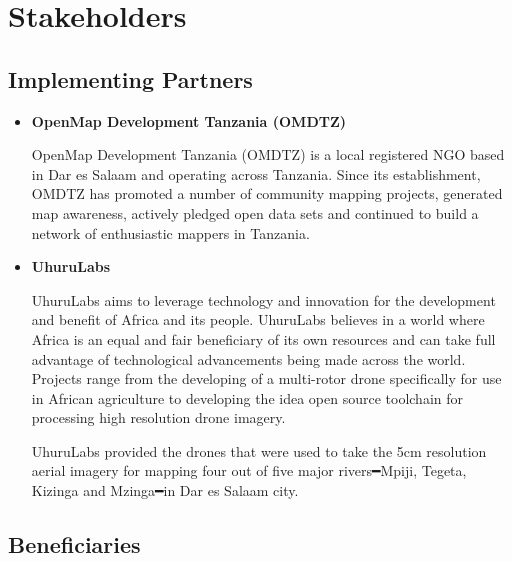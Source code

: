 \documentclass[a4paper,12pt,twoside]{article}
\begin{document}
\section{Stakeholders}

\subsection{Implementing Partners}

    \begin{itemize}
        \item \textbf{OpenMap Development Tanzania (OMDTZ)} %
    
        OpenMap Development Tanzania (OMDTZ) is a local registered NGO based in Dar es Salaam and operating across Tanzania. Since its establishment, OMDTZ has promoted a number of community mapping projects, generated map awareness, actively pledged open data sets and continued to build a network of enthusiastic mappers in Tanzania.
    
        \item \textbf{UhuruLabs}
    
        UhuruLabs aims to leverage technology and innovation for the development and benefit of Africa and its people. UhuruLabs believes in a world where Africa is an equal and fair beneficiary of its own resources and can take full advantage of technological advancements being made across the world. Projects range from the developing of a multi-rotor drone specifically for use in African agriculture to developing the idea open source toolchain for processing high resolution drone imagery. 
    
        UhuruLabs provided the drones that were used to take the 5cm resolution aerial imagery for mapping four out of five major rivers━Mpiji, Tegeta, Kizinga and Mzinga━in Dar es Salaam city.
    
    \end{itemize}

\subsection{Beneficiaries}
\end{document}
